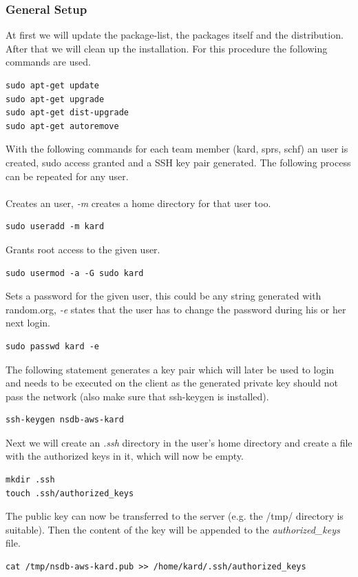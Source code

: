 \subsubsection{General Setup}
\label{sec:setup}
At first we will update the package-list, the packages itself and the distribution. After that we will clean up the installation. For this procedure the following commands are used.
\begin{lstlisting}
sudo apt-get update
sudo apt-get upgrade
sudo apt-get dist-upgrade
sudo apt-get autoremove
\end{lstlisting}

With the following commands for each team member (kard, sprs, schf) an user is created, sudo access granted and a SSH key pair generated. The following process can be repeated for any user. 
\\\\
Creates an user, \textit{-m} creates a home directory for that user too.
\begin{lstlisting}
sudo useradd -m kard
\end{lstlisting}

Grants root access to the given user.
\begin{lstlisting}
sudo usermod -a -G sudo kard
\end{lstlisting}

Sets a password for the given user, this could be any string generated with random.org, \textit{-e} states that the user has to change the password during his or her next login.
\begin{lstlisting}
sudo passwd kard -e
\end{lstlisting}

The following statement generates a key pair which will later be used to login and needs to be executed on the client as the generated private key should not pass the network (also make sure that ssh-keygen is installed).
\begin{lstlisting}
ssh-keygen nsdb-aws-kard
\end{lstlisting}

Next we will create an \textit{.ssh} directory in the user's home directory and create a file with the authorized keys in it, which will now be empty.
\begin{lstlisting}
mkdir .ssh
touch .ssh/authorized_keys
\end{lstlisting}

The public key can now be transferred to the server (e.g. the /tmp/ directory is suitable). Then the content of the key will be appended to the \textit{authorized\_keys} file.
\begin{lstlisting}
cat /tmp/nsdb-aws-kard.pub >> /home/kard/.ssh/authorized_keys
\end{lstlisting}

